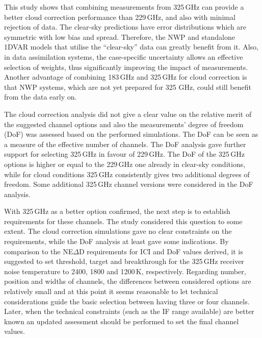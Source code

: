 \documentclass[12pt]{article}
\begin{document}
This study shows that combining measurements from 325\,GHz can provide a better
cloud correction performance than 229\,GHz, and also with minimal rejection of
data. The clear-sky predictions have error distributions which are symmetric
with low bias and spread. Therefore, the NWP and standalone 1DVAR models that
utilise the ``clear-sky'' data can greatly benefit from it. Also, in data
assimilation systems, the case-specific uncertainty allows an effective
selection of weights, thus significantly improving the impact of measurements.
Another advantage of combining 183\,GHz and 325\,GHz for cloud correction is
that NWP systems, which are not yet prepared for 325 GHz, could still benefit
from the data early on. 

The cloud correction analysis did not give a clear value on the relative merit
of the suggested channel options and also the measurements' degree of freedom
(DoF) was assessed based on the performed simulations. The DoF can be seen as a
measure of the effective number of channels. The DoF analysis gave further
support for selecting 325\,GHz in favour of 229\,GHz. The DoF of the 325\,GHz
options is higher or equal to the 229\,GHz one already in clear-sky conditions,
while for cloud conditions 325\,GHz consistently gives two additional degrees
of freedom. Some additional 325\,GHz channel versions were considered in the DoF
analysis.

With 325\,GHz as a better option confirmed, the next step is to establish
requirements for these channels. The study considered this question to some
extent. The cloud correction simulations gave no clear constraints on the
requirements, while the DoF analysis at least gave some indications. By
comparison to the NE$\Delta$D requirements for ICI and DoF values derived, it
is suggested to set threshold, target and breakthrough for the 325\,GHz
receiver noise temperature to 2400, 1800 and 1200\,K, respectively. Regarding
number, position and widths of channels, the differences between considered
options are relatively small and at this point it seems reasonable to let
technical considerations guide the basic selection between having three or four
channels. Later, when the technical constraints (such as the IF range
available) are better known an updated assessment should be performed to set
the final channel values.

\vspace{10mm}
\setcounter{tocdepth}{1} 
\tableofcontents


\newpage
{}
\setcounter{page}{1}
\end{document}
